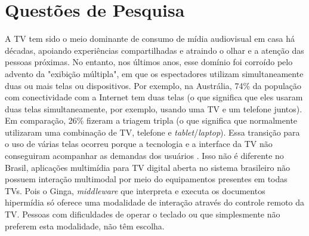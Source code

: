 \section{Questões de Pesquisa}
\newtheorem{prob}{Questão}

A TV tem sido o meio dominante de consumo de mídia audiovisual em casa há décadas, apoiando experiências compartilhadas e atraindo o olhar e a atenção das pessoas próximas. No entanto, nos últimos anos, esse domínio foi corroído pelo advento da "exibição múltipla", em que os espectadores utilizam simultaneamente duas ou mais telas ou dispositivos. Por exemplo, na Austrália, 74\% da população com conectividade com a Internet tem duas telas (o que significa que eles usaram duas telas simultaneamente, por exemplo, usando uma TV e um telefone juntos). Em comparação, 26\% fizeram a triagem tripla (o que significa que normalmente utilizaram uma combinação de TV, telefone e \textit{tablet}/\textit{laptop}). Essa transição para o uso de várias telas ocorreu porque a tecnologia e a interface da TV não conseguiram acompanhar as demandas dos usuários \cite{mcgill2015review}. Isso não é diferente no Brasil, aplicações multimídia para TV digital aberta no sistema brasileiro não possuem interação multimodal por meio do equipamentos presentes em todas TVs. Pois o Ginga, \textit{middleware} que interpreta e executa os documentos hipermídia só oferece uma modalidade de interação através do controle remoto da TV. Pessoas com dificuldades de operar o teclado ou que simplesmente não preferem esta modalidade, não têm escolha.

